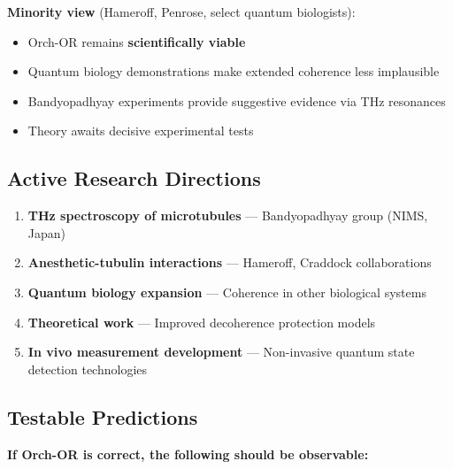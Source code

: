 \textbf{Minority view} (Hameroff, Penrose, select quantum biologists):
\begin{itemize}
\item Orch-OR remains \textbf{scientifically viable}
\item Quantum biology demonstrations make extended coherence less implausible
\item Bandyopadhyay experiments provide suggestive evidence via THz resonances
\item Theory awaits decisive experimental tests
\end{itemize}

\subsection{Active Research Directions}

\begin{enumerate}
\item \textbf{THz spectroscopy of microtubules} --- Bandyopadhyay group (NIMS, Japan)
\item \textbf{Anesthetic-tubulin interactions} --- Hameroff, Craddock collaborations
\item \textbf{Quantum biology expansion} --- Coherence in other biological systems
\item \textbf{Theoretical work} --- Improved decoherence protection models
\item \textbf{In vivo measurement development} --- Non-invasive quantum state detection technologies
\end{enumerate}

\subsection{Testable Predictions}

\textbf{If Orch-OR is correct, the following should be observable:}

